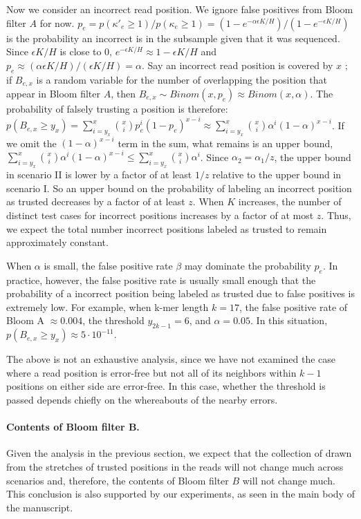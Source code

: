 \documentclass[10pt]{article}
\begin{document}
Now we consider an incorrect read position.  We ignore false positives from Bloom filter $A$ for now.
$p_e = p(\kappa'_e\ge 1)/p(\kappa_e\ge 1) = (1-e^{-\alpha\epsilon K/H})/(1-e^{-\epsilon K/H})$ is the probability an incorrect \kmer is in the subsample given that it was sequenced.
Since $\epsilon K/H$ is close to 0, $e^{-\epsilon K/H}\approx 1-\epsilon K/H$ and $p_e \approx (\alpha \epsilon K/H)/(\epsilon K/H)=\alpha$.
Say an incorrect read position is covered by $x$ \kmers; if $B_{e,x}$ is a random variable for the number of \kmers overlapping the position that appear in Bloom filter $A$, then $B_{e,x} \sim Binom(x, p_e) \approx Binom(x, \alpha)$.  The probability of falsely trusting a position is therefore: 
$p(B_{e, x}\geq y_x)=\sum_{i=y_x}^x \binom{x}{i} p_e^i(1-p_e)^{x-i} \approx \sum_{i=y_x}^x \binom{x}{i} \alpha^i(1-\alpha)^{x-i}$.  If we omit the $(1-\alpha)^{x-i}$ term in the sum, what remains is an upper bound, \thatis $\sum_{i=y_x}^x \binom{x}{i} \alpha^i(1-\alpha)^{x-i} \leq \sum_{i=y_x}^x \binom{x}{i} \alpha^i$.  Since $\alpha_2 = \alpha_1/z$, the upper bound in scenario II is lower by a factor of at least $1/z$ relative to the upper bound in scenario I.  So an upper bound on the probability of labeling an incorrect position as trusted decreases by a factor of at least $z$.  When $K$ increases, the number of distinct test cases for incorrect positions increases by a factor of at most $z$.  Thus, we expect the total number incorrect positions labeled as trusted to remain approximately constant.

When $\alpha$ is small, the false positive rate $\beta$ may dominate the probability $p_e$.  In practice, however, the false positive rate is usually small enough that the probability of a incorrect position being labeled as trusted due to false positives is extremely low.  For example, when k-mer length $k=17$, the false positive rate of Bloom A $\approx 0.004$, the threshold $y_{2k-1} = 6$, and $\alpha = 0.05$.  In this situation, $p(B_{e, x}\geq y_x) \approx 5 \cdot 10^{-11}.$

The above is not an exhaustive analysis, since we have not examined the case where a read position is error-free but not all of its neighbors within $k-1$ positions on either side are error-free.  In this case, whether the threshold is passed depends chiefly on the whereabouts of the nearby errors.

\paragraph{Contents of Bloom filter B.}
Given the analysis in the previous section, we expect that the collection of \kmers drawn from the stretches of trusted positions in the reads will not change much across scenarios and, therefore, the contents of Bloom filter $B$ will not change much.  This conclusion is also supported by our experiments, as seen in the main body of the manuscript.
\end{document}
